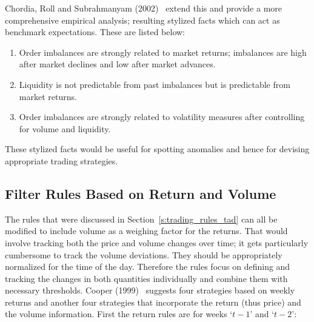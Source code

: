 Chordia, Roll and Subrahmanyam (2002)~\cite{chorroll} extend this and provide a more comprehensive empirical analysis; resulting stylized facts which can act as benchmark expectations. These are listed below:
	\begin{enumerate}[--]
	\item Order imbalances are strongly related to market returns; imbalances are high after market declines and low after market advances.
	\item Liquidity is not predictable from past imbalances but is predictable from market returns.
	\item Order imbalances are strongly related to volatility measures after controlling for volume and liquidity. 
	\end{enumerate}
These stylized facts would be useful for spotting anomalies and hence for devising appropriate trading strategies. 



\subsection{Filter Rules Based on Return and Volume\label{sec:filter_rule_retvol}} \label{in:filter3}

The rules that were discussed in Section~\ref{s:trading_rules_tad} can all be modified to include volume as a weighing factor for the returns. That would involve tracking both the price and volume changes over time; it gets particularly cumbersome to track the volume deviations. They should be appropriately normalized for the time of the day. Therefore the rules focus on defining and tracking the changes in both quantities individually and combine them with necessary thresholds. Cooper (1999)~\cite{cooper} suggests four strategies based on weekly returns and another four strategies that incorporate the return (thus price) and the volume information. First the return rules are for weeks `$t-1$' and `$t-2$': 

